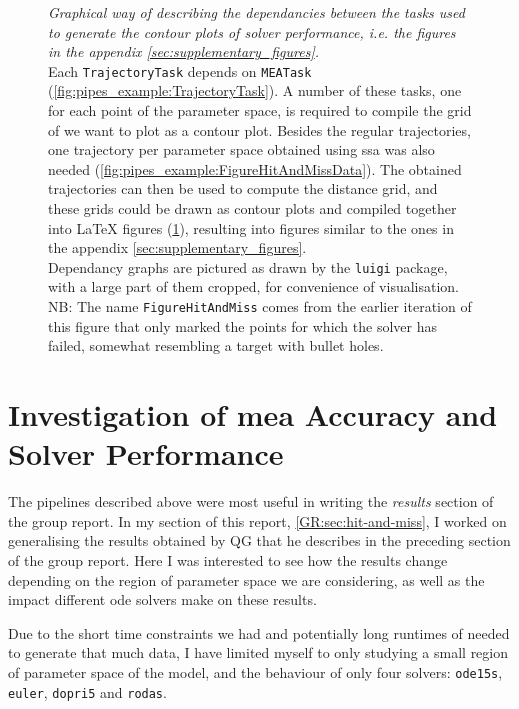 \begin{figure}
\begin{subfigure}[t]{\textwidth}
        \label{fig:pipes_example:FigureHitAndMissTex}
    \end{subfigure}
    \caption{\emph{Graphical way of describing the dependancies between the tasks used to generate the contour plots of solver performance, i.e. the figures in the appendix \autoref{sec:supplementary_figures}.}\\ 
    Each  \texttt{TrajectoryTask} depends on \texttt{MEATask} (\ref{fig:pipes_example:TrajectoryTask}).
    A number of these tasks, one for each point of the parameter space, is required to compile the grid of we want to plot as a contour plot.
    Besides the regular trajectories, one trajectory per parameter space obtained using \acrlong{ssa} was also needed (\ref{fig:pipes_example:FigureHitAndMissData}).
    The obtained trajectories can then be used to compute the distance grid, and these grids could be drawn as contour plots and compiled together into \LaTeX{} figures (\ref{fig:pipes_example:FigureHitAndMissTex}), resulting into figures similar to the ones in the appendix \autoref{sec:supplementary_figures}.\\
    Dependancy graphs are pictured as drawn by the {\tt luigi} package, with a large part of them cropped, for convenience of visualisation.\\
    NB: The name {\tt FigureHitAndMiss} comes from the earlier iteration of this figure that only marked the points for which the solver has failed, somewhat resembling a target with bullet holes.}
    \label{fig:pipes_example}
\end{figure}

\section{Investigation of \acrshort{mea} Accuracy and Solver Performance}

The pipelines described above were most useful in writing the \emph{results} section of the group report. In my section of this report, \autoref{GR:sec:hit-and-miss}, I worked on generalising the results obtained by QG that he describes in the preceding section of the group report. 
Here I was interested to see how the results change depending on the region of parameter space we are considering, as well as the impact different \gls{ode} solvers make on these results.

Due to the short time constraints we had and potentially long runtimes of needed to generate that much data, I have limited myself to only studying a small region of parameter space of the \pft{} model, and the behaviour of only four solvers: \texttt{ode15s}, \texttt{euler}, \texttt{dopri5} and \texttt{rodas}.

